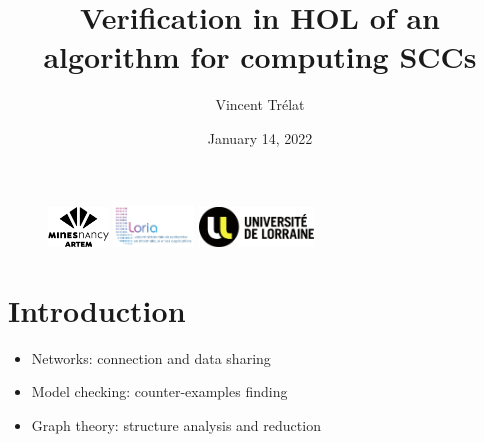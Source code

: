 \documentclass{beamer}
\title[Midterm presentation of the research course]{Verification in HOL of an algorithm for computing SCCs}
\date{January 14, 2022}
\author[V. Trélat]{Vincent Trélat}
\institute[Mines Nancy]{\normalsize{École Nationale Supérieure des Mines de Nancy\\Département Informatique}}
\theoremstyle{definition}
\begin{document}
\begin{frame}
  \begin{figure}[t]
    \centering
    \includegraphics[height=30pt]{img/logoartem.png}
    \hspace{1cm}
    \includegraphics[height=32pt]{img/logoloria.jpg}
    \hspace{1cm}
    \includegraphics[height=30pt]{img/logoUL.png}
  \end{figure}
  \titlepage
\end{frame}

\section{Introduction}
\begin{frame}
  \tableofcontents
\end{frame}

\begin{frame}
  \begin{itemize}
    \item Networks: connection and data sharing
    \vfill
    \item Model checking: counter-examples finding
    \vfill
    \item Graph theory: structure analysis and reduction
  \end{itemize}
\end{frame}
\end{document}
